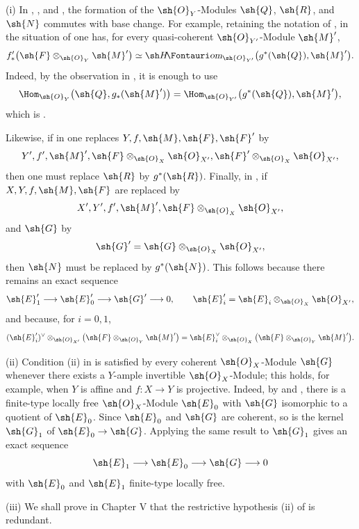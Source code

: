 \begin{remarks}[7.7.9]
\label{III.7.7.9}
\textnormal{(i)}
In , , and
, the formation of the $\sh{O}_Y$-Modules
$\sh{Q}$, $\sh{R}$, and $\sh{N}$ commutes with base change.
For example, retaining the notation of , in
the situation of  one has, for every
quasi-coherent $\sh{O}_{Y'}$-Module $\sh{M}'$,
\[
  f'_*
  \bigl(\sh{F}\otimes_{\sh{O}_Y}\sh{M}'\bigr)
  \simeq
  \shHom_{\sh{O}_{Y'}}
  \bigl(g^*(\sh{Q}),\sh{M}'\bigr).
\]
Indeed, by the observation in , it is enough
to use
\[
  \Hom_{\sh{O}_Y}
  \bigl(\sh{Q},g_*(\sh{M}')\bigr)
  =
  \Hom_{\sh{O}_{Y'}}
  \bigl(g^*(\sh{Q}),\sh{M}'\bigr),
\]
which is .

Likewise, if in  one replaces
$Y,f,\sh{M},\sh{F},\sh{F}'$ by
\[
  Y',f',\sh{M}',
  \sh{F}\otimes_{\sh{O}_X}\sh{O}_{X'},
  \sh{F}'\otimes_{\sh{O}_X}\sh{O}_{X'},
\]
then one must replace $\sh{R}$ by $g^*(\sh{R})$.
Finally, in , if
$X,Y,f,\sh{M},\sh{F}$ are replaced by
\[
  X',Y',f',\sh{M}',
  \sh{F}\otimes_{\sh{O}_X}\sh{O}_{X'},
\]
and $\sh{G}$ by
\[
  \sh{G}'
  =
  \sh{G}\otimes_{\sh{O}_X}\sh{O}_{X'},
\]
then $\sh{N}$ must be replaced by $g^*(\sh{N})$.  This
follows because there remains an exact sequence
\[
  \sh{E}'_1\longrightarrow
  \sh{E}'_0\longrightarrow
  \sh{G}'\longrightarrow0,
  \qquad
  \sh{E}'_i
  =
  \sh{E}_i\otimes_{\sh{O}_X}\sh{O}_{X'},
\]
and because, for $i=0,1$,
\[
  (\sh{E}'_i)^\vee
  \otimes_{\sh{O}_{X'}}
  \bigl(\sh{F}\otimes_{\sh{O}_Y}\sh{M}'\bigr)
  =
  \sh{E}_i^\vee
  \otimes_{\sh{O}_X}
  \bigl(\sh{F}\otimes_{\sh{O}_Y}\sh{M}'\bigr).
\]

\medskip
\textnormal{(ii)}
Condition (ii) in  is satisfied by every
coherent $\sh{O}_X$-Module $\sh{G}$ whenever there exists a
$Y$-ample invertible $\sh{O}_X$-Module; this holds, for
example, when $Y$ is affine and $f:X\to Y$ is projective.
Indeed, by  and ,
there is a finite-type locally free $\sh{O}_X$-Module
$\sh{E}_0$ with $\sh{G}$ isomorphic to a quotient of
$\sh{E}_0$.  Since $\sh{E}_0$ and $\sh{G}$ are coherent, so
is the kernel $\sh{G}_1$ of $\sh{E}_0\to\sh{G}$.  Applying
the same result to $\sh{G}_1$ gives an exact sequence
\[
  \sh{E}_1\longrightarrow
  \sh{E}_0\longrightarrow
  \sh{G}\longrightarrow0
\]
with $\sh{E}_0$ and $\sh{E}_1$ finite-type locally free.

\medskip
\textnormal{(iii)}
We shall prove in Chapter V that the restrictive hypothesis
(ii) of  is redundant.
\end{remarks}

